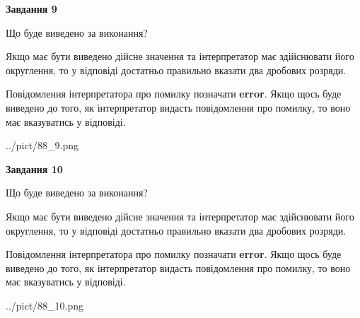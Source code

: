 \documentclass[12pt, ukrainian]{article}
\begin{document}
{\begin {Large}
{\begin {center}\textbf{Завдання 9}\end {center}}\par
Що буде виведено за виконання? \par

Якщо має бути виведено дійсне значення та інтерпретатор має здійснювати його округлення, 
то у відповіді достатньо правильно вказати два дробових розряди.

Повідомлення інтерпретатора про помилку позначати \textbf{error}.
Якщо щось буде виведено до того, як інтерпретатор видасть повідомлення про помилку, 
то воно має вказуватись у відповіді. \par

\begin{center}
	{../pict/88_9.png}
\end{center}
\newpage

{\begin {center}\textbf{Завдання 10}\end {center}}\par
Що буде виведено за виконання? \par

Якщо має бути виведено дійсне значення та інтерпретатор має здійснювати його округлення, 
то у відповіді достатньо правильно вказати два дробових розряди.

Повідомлення інтерпретатора про помилку позначати \textbf{error}.
Якщо щось буде виведено до того, як інтерпретатор видасть повідомлення про помилку, 
то воно має вказуватись у відповіді. \par

\begin{center}
	{../pict/88_10.png}
\end{center}
\newpage

\end {Large}}
\end{document}
